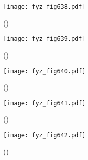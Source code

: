 {    \begin{figure}[ht!] %
      \centering
      \texttt{[image: fyz\_fig638.pdf]}
      \caption{
               (\cite[s.~707]{Feynman02})}
      \label{fyz_fig638}
    \end{figure}

    \begin{figure}[ht!] %
      \centering
      \texttt{[image: fyz\_fig639.pdf]}
      \caption{
               (\cite[s.~707]{Feynman02})}
      \label{fyz_fig639}
    \end{figure}

    \begin{figure}[ht!] %
      \centering
      \texttt{[image: fyz\_fig640.pdf]}
      \caption{
               (\cite[s.~707]{Feynman02})}
      \label{fyz_fig640}
    \end{figure}

    \begin{figure}[ht!] %
      \centering
      \texttt{[image: fyz\_fig641.pdf]}
      \caption{
               (\cite[s.~707]{Feynman02})}
      \label{fyz_fig641}
    \end{figure}

    \begin{figure}[ht!] %
      \centering
      \texttt{[image: fyz\_fig642.pdf]}
      \caption{
               (\cite[s.~707]{Feynman02})}
      \label{fyz_fig642}
    \end{figure}



} %
\printbibliography[title={Seznam literatury},heading=subbibliography]
